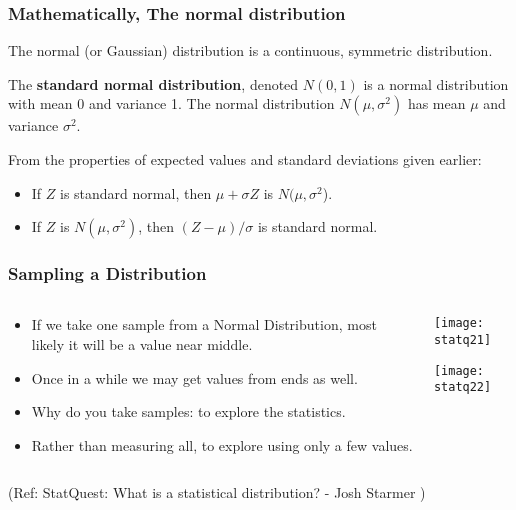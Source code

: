 \begin{frame}
\frametitle{Mathematically, The normal distribution}

The normal (or Gaussian) distribution is a continuous, symmetric distribution.

The {\bf standard normal distribution}, denoted $N(0,1)$ is a normal
distribution with mean 0 and variance 1.  The normal distribution
$N(\mu, \sigma^2)$ has mean $\mu$ and variance $\sigma^2$.

From the properties of expected values and standard deviations given earlier:

\begin{itemize}

\item If $Z$ is standard normal, then $\mu + \sigma Z$ is
  $N(\mu,\sigma^2$).

\item If $Z$ is $N(\mu, \sigma^2)$, then $(Z-\mu)/\sigma$ is standard
  normal.

\end{itemize}

\end{frame}

\begin{frame}[fragile]\frametitle{Sampling a Distribution}
\begin{columns}
    \begin{column}[T]{0.6\linewidth}
	\begin{itemize}
	\item If we take one sample from a Normal Distribution, most likely it will be a value near middle.
	\item Once in a while we may get values from ends as well.
	\item Why do you take samples: to explore the statistics.
	\item Rather than measuring all, to explore using only a few values.
	\end{itemize}

    \end{column}
    \begin{column}[T]{0.4\linewidth}
      \begin{center}
      \texttt{[image: statq21]}
	  
	  \texttt{[image: statq22]}
	   
	  	\end{center}
    \end{column}

  \end{columns}
  
\tiny{(Ref: StatQuest: What is a statistical distribution? - Josh Starmer )}
\end{frame}

